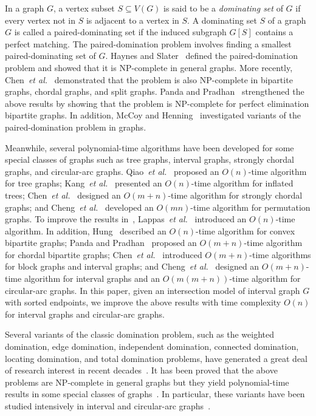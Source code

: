 \documentclass[12pt]{article}
\begin{document}
In a graph $G$, a vertex subset $S\subseteq V(G)$ is said to be a
{\em dominating set} of $G$ if every vertex not in $S$ is adjacent
to a vertex in $S$. A dominating set $S$ of a graph $G$ is called
a paired-dominating set if the induced subgraph $G[S]$ contains a
perfect matching. The paired-domination problem involves finding a
smallest paired-dominating set of $G$. Haynes and
Slater~\cite{HS98} defined the paired-domination problem and
showed that it is NP-complete in general graphs. More recently,
Chen~{\em et al.}~\cite{Chen10} demonstrated that the problem is
also NP-complete in bipartite graphs, chordal graphs, and split
graphs. Panda and Pradhan~\cite{Panda12} strengthened the above
results by showing that the problem is NP-complete for perfect
elimination bipartite graphs. In addition, McCoy and
Henning~\cite{McCoy09} investigated variants of the
paired-domination problem in graphs.



Meanwhile, several polynomial-time algorithms have been developed
for some special classes of graphs such as tree graphs, interval
graphs, strongly chordal graphs, and circular-arc graphs.
Qiao~{\em et al.}~\cite{QKCD03} proposed an $O(n)$-time algorithm
for tree graphs; Kang~{\em et al.}~\cite{KSC04} presented an
$O(n)$-time algorithm for inflated trees; Chen~{\em et
al.}~\cite{Chen09} designed an $O(m+n)$-time algorithm for
strongly chordal graphs; and Cheng~{\em et al.}~\cite{CKS09}
developed an $O(mn)$-time algorithm for permutation graphs. To
improve the results in~\cite{CKS09}, Lappas~{\em et
al.}~\cite{Lappas09} introduced an $O(n)$-time algorithm. In
addition, Hung~\cite{Hung12} described an $O(n)$-time algorithm
for convex bipartite graphs; Panda and Pradhan~\cite{Panda12}
proposed an $O(m+n)$-time algorithm for chordal bipartite graphs;
Chen~{\em et al.}~\cite{Chen10} introduced $O(m+n)$-time
algorithms for block graphs and interval graphs; and Cheng~{\em et
al.}~\cite{CKN07} designed an $O(m+n)$-time algorithm for interval
graphs and an $O(m(m+n))$-time algorithm for circular-arc graphs.
In this paper, given an intersection model of interval graph $G$
with sorted endpoints, we improve the above results with time
complexity $O(n)$ for interval graphs and circular-arc graphs.


Several variants of the classic domination problem, such as the
weighted domination, edge domination, independent domination,
connected domination, locating domination, and total domination
problems, have generated a great deal of research interest in
recent decades~\cite{Chang04,Haynes98,Haynes98-2,Hedetniemi91}. It
has been proved that the above problems are NP-complete in general
graphs but they yield polynomial-time results in some special
classes of
graphs~\cite{Bertossi88,D'Atri88,Chang97,Lu02,Ramalingam88,Chang98}.
In particular, these variants have been studied  intensively in
interval and circular-arc graphs~\cite{Ramalingam88,Chang98}.
\end{document}
